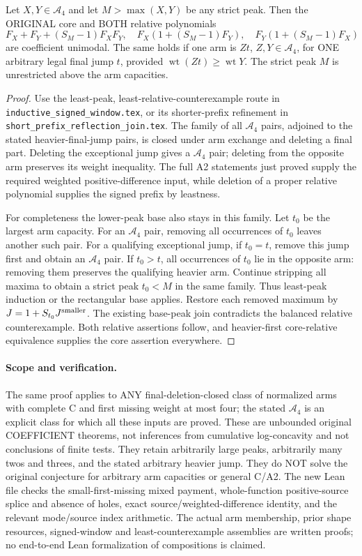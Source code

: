 \begin{theorem}
Let $X,Y\in\mathcal A_4$ and let $M>\max(X,Y)$ be any strict peak.
Then the ORIGINAL core and BOTH relative polynomials
\[
 F_X+F_Y+(S_M-1)F_XF_Y,\quad
 F_X(1+(S_M-1)F_Y),\quad F_Y(1+(S_M-1)F_X)
\]
are coefficient unimodal. The same holds if one arm is $Zt$,
$Z,Y\in\mathcal A_4$, for ONE arbitrary legal final jump $t$,
provided $\operatorname{wt}(Zt)\ge\operatorname{wt}Y$.
The strict peak $M$ is unrestricted above the arm capacities.
\end{theorem}
\begin{proof}
Use the least-peak, least-relative-counterexample route in
\texttt{inductive\_signed\_window.tex}, or its shorter-prefix
refinement in \texttt{short\_prefix\_reflection\_join.tex}.
The family of all $\mathcal A_4$ pairs, adjoined to the stated
heavier-final-jump pairs, is closed under arm exchange and deleting
a final part. Deleting the exceptional jump gives a $\mathcal A_4$
pair; deleting from the opposite arm preserves its weight inequality.
The full A2 statements just proved supply the required weighted
positive-difference input, while deletion of a proper relative
polynomial supplies the signed prefix by leastness.

For completeness the lower-peak base also stays in this family.
Let $t_0$ be the largest arm capacity. For an $\mathcal A_4$
pair, removing all occurrences of $t_0$ leaves another such pair.
For a qualifying exceptional jump, if $t_0=t$, remove this jump
first and obtain an $\mathcal A_4$ pair. If $t_0>t$, all occurrences
of $t_0$ lie in the opposite arm: removing them preserves the
qualifying heavier arm. Continue stripping all maxima to obtain a
strict peak $t_0<M$ in the same family. Thus least-peak induction
or the rectangular base applies.
Restore each removed maximum by $J=1+S_{t_0}J^{\rm smaller}$.
The existing base-peak join contradicts the balanced relative
counterexample. Both relative assertions follow, and heavier-first
core-relative equivalence supplies the core assertion everywhere.
\end{proof}

\paragraph{Scope and verification.}
The same proof applies to ANY final-deletion-closed class of normalized
arms with complete C and first missing weight at most four; the stated
$\mathcal A_4$ is an explicit class for which all these inputs are proved.
These are unbounded original COEFFICIENT theorems, not inferences
from cumulative log-concavity and not conclusions of finite tests.
They retain arbitrarily large peaks, arbitrarily many twos and
threes, and the stated arbitrary heavier jump. They do NOT solve
the original conjecture for arbitrary arm capacities or general C/A2.
The new Lean file checks the small-first-missing mixed payment,
whole-function positive-source splice and absence of holes, exact
source/weighted-difference identity, and the relevant mode/source
index arithmetic. The actual arm membership, prior shape resources,
signed-window and least-counterexample assemblies are written proofs;
no end-to-end Lean formalization of compositions is claimed.
